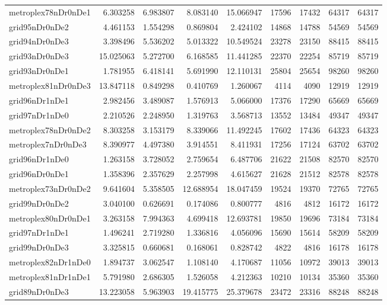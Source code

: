 \begin{longtable}{|l|r|r|r|r|r|r|r|r|}
metroplex78nDr0nDe1 & 6.303258 & 6.983807 & 8.083140 & 15.066947 & 17596 & 17432 & 64317 & 64317 \\
grid95nDr0nDe2 & 4.461153 & 1.554298 & 0.869804 & 2.424102 & 14868 & 14788 & 54569 & 54569 \\
grid94nDr0nDe3 & 3.398496 & 5.536202 & 5.013322 & 10.549524 & 23278 & 23150 & 88415 & 88415 \\
grid93nDr0nDe3 & 15.025063 & 5.272700 & 6.168585 & 11.441285 & 22370 & 22254 & 85719 & 85719 \\
grid93nDr0nDe1 & 1.781955 & 6.418141 & 5.691990 & 12.110131 & 25804 & 25654 & 98260 & 98260 \\
metroplex81nDr0nDe3 & 13.847118 & 0.849298 & 0.410769 & 1.260067 & 4114 & 4090 & 12919 & 12919 \\
grid96nDr1nDe1 & 2.982456 & 3.489087 & 1.576913 & 5.066000 & 17376 & 17290 & 65669 & 65669 \\
grid97nDr1nDe0 & 2.210526 & 2.248950 & 1.319763 & 3.568713 & 13552 & 13484 & 49347 & 49347 \\
metroplex78nDr0nDe2 & 8.303258 & 3.153179 & 8.339066 & 11.492245 & 17602 & 17436 & 64323 & 64323 \\
metroplex7nDr0nDe3 & 8.390977 & 4.497380 & 3.914551 & 8.411931 & 17256 & 17124 & 63702 & 63702 \\
grid96nDr1nDe0 & 1.263158 & 3.728052 & 2.759654 & 6.487706 & 21622 & 21508 & 82570 & 82570 \\
grid96nDr0nDe1 & 1.358396 & 2.357629 & 2.257998 & 4.615627 & 21628 & 21512 & 82578 & 82578 \\
metroplex73nDr0nDe2 & 9.641604 & 5.358505 & 12.688954 & 18.047459 & 19524 & 19370 & 72765 & 72765 \\
grid99nDr0nDe2 & 3.040100 & 0.626691 & 0.174086 & 0.800777 & 4816 & 4812 & 16172 & 16172 \\
metroplex80nDr0nDe1 & 3.263158 & 7.994363 & 4.699418 & 12.693781 & 19850 & 19696 & 73184 & 73184 \\
grid97nDr1nDe1 & 1.496241 & 2.719280 & 1.336816 & 4.056096 & 15690 & 15614 & 58209 & 58209 \\
grid99nDr0nDe3 & 3.325815 & 0.660681 & 0.168061 & 0.828742 & 4822 & 4816 & 16178 & 16178 \\
metroplex82nDr1nDe0 & 1.894737 & 3.062547 & 1.108140 & 4.170687 & 11056 & 10972 & 39013 & 39013 \\
metroplex81nDr1nDe1 & 5.791980 & 2.686305 & 1.526058 & 4.212363 & 10210 & 10134 & 35360 & 35360 \\
grid89nDr0nDe3 & 13.223058 & 5.963903 & 19.415775 & 25.379678 & 23472 & 23316 & 88248 & 88248 \\

\end{longtable}
